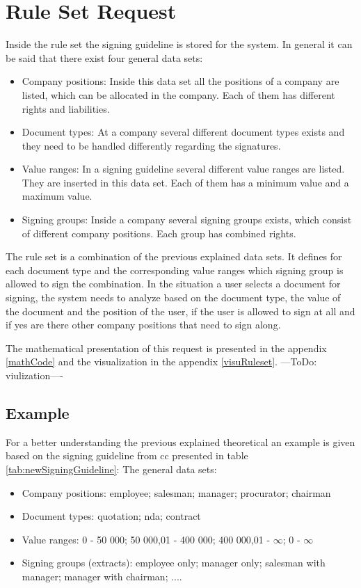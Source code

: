\section{Rule Set Request}
Inside the rule set the signing guideline is stored for the system. In general it can be said that there exist four general data sets:
\begin{itemize}
	\item Company positions: \newline
	Inside this data set all the positions of a company are listed, which can be allocated in the company. Each of them has different rights and liabilities.
	\item Document types: \newline
	At a company several different document types exists and they need to be handled differently regarding the signatures. 
	\item Value ranges: \newline
	In a signing guideline several different value ranges are listed. They are inserted in this data set. Each of them has a minimum value and a maximum value.
	\item Signing groups: \newline
	Inside a company several signing groups exists, which consist of different company positions. Each group has combined rights.
\end{itemize}

The rule set is a combination of the previous explained data sets. It defines for each document type and the corresponding value ranges which signing group is allowed to sign the combination. \newline
In the situation a user selects a document for signing, the system needs to analyze based on the document type, the value of the document and the position of the user, if the user is allowed to sign at all and if yes are there other company positions that need to sign along. 

The mathematical presentation of this request is presented in the appendix \ref{mathCode} and the visualization in the appendix \ref{visuRuleset}. ---ToDo: viulization----

\subsection*{Example}
For a better understanding the previous explained theoretical an example is given based on the signing guideline from \gls{cc} presented in table \ref{tab:newSigningGuideline}: \newline
The general data sets:
\begin{itemize}
	\item Company positions: employee; salesman; manager; procurator; chairman
	\item Document types: quotation; \gls{nda}; contract
	\item Value ranges: 0 - 50 000; 50 000,01 - 400 000; 400 000,01 - $\infty$; 0 - $\infty$
	\item Signing groups (extracts): employee only; manager only; salesman with manager; manager with chairman; ....
\end{itemize}

